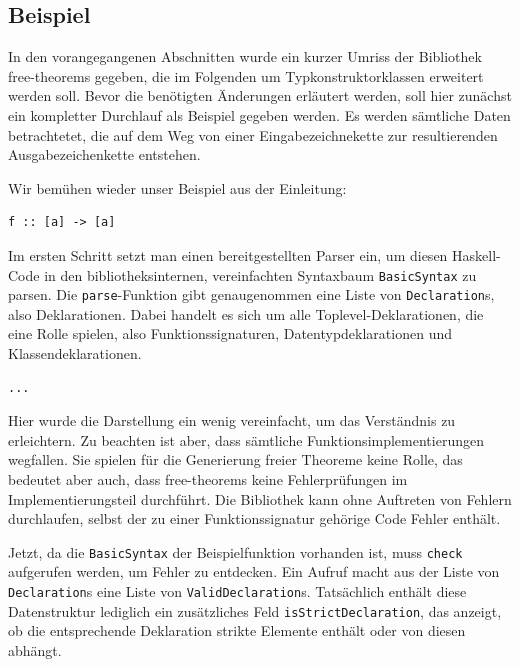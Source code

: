 \subsection{Beispiel}

In den vorangegangenen Abschnitten wurde ein kurzer Umriss der Bibliothek free-theorems gegeben, die im Folgenden um
Typkonstruktorklassen erweitert werden soll. Bevor die benötigten Änderungen erläutert werden, soll hier zunächst ein
kompletter Durchlauf als Beispiel gegeben werden. Es werden sämtliche Daten betrachtetet, die auf dem Weg von einer
Eingabezeichnekette zur resultierenden Ausgabezeichenkette entstehen.


Wir bemühen wieder unser Beispiel aus der Einleitung:

\begin{verbatim}
f :: [a] -> [a]
\end{verbatim}

Im ersten Schritt setzt man einen bereitgestellten Parser ein, um diesen Haskell-Code in den bibliotheksinternen, vereinfachten
Syntaxbaum \texttt{BasicSyntax} zu parsen. Die \texttt{parse}-Funktion gibt genaugenommen eine Liste von \texttt{Declaration}s, also Deklarationen. Dabei handelt es sich um alle Toplevel-Deklarationen, die eine Rolle spielen, also Funktionssignaturen,
Datentypdeklarationen und Klassendeklarationen.

\begin{verbatim}
...
\end{verbatim}

Hier wurde die Darstellung ein wenig vereinfacht, um das Verständnis zu erleichtern. Zu beachten ist aber, dass sämtliche
Funktionsimplementierungen wegfallen. Sie spielen für die Generierung freier Theoreme keine Rolle, das bedeutet aber auch,
dass free-theorems keine Fehlerprüfungen im Implementierungsteil durchführt. Die Bibliothek kann ohne Auftreten von Fehlern
durchlaufen, selbst der zu einer Funktionssignatur gehörige Code Fehler enthält.

Jetzt, da die \texttt{BasicSyntax} der Beispielfunktion vorhanden ist, muss \texttt{check} aufgerufen werden, um Fehler
zu entdecken. Ein Aufruf macht aus der Liste von \texttt{Declaration}s eine Liste von \texttt{ValidDeclaration}s. Tatsächlich
enthält diese Datenstruktur lediglich ein zusätzliches Feld \texttt{isStrictDeclaration}, das anzeigt, ob die entsprechende
Deklaration strikte Elemente enthält oder von diesen abhängt.

